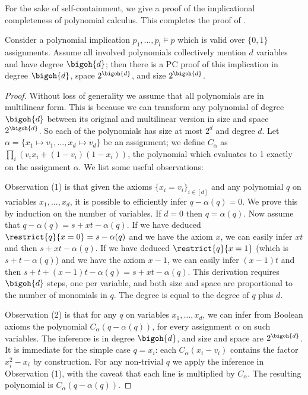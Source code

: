 \documentclass{toc}
\begin{document}
For the sake of self-containment, we give a proof of the
implicational completeness of polynomial calculus. This completes the proof
%
of .    %

\begin{lemma}\label{lmm:pccompleteness}
  Consider a polynomial implication $p_{1}, \ldots, p_{l}\models p$ which is valid over $\{0,1\}$ assignments. Assume all involved polynomials collectively mention $d$ variables and have degree $\bigoh{d}$; then there is a PC proof of this implication in degree $\bigoh{d}$, space $2^{\bigoh{d}}$, and size $2^{\bigoh{d}}$.
\end{lemma}
\begin{proof} Without loss of generality we assume that all
  polynomials are in multilinear form. This is because we can
  transform any polynomial of degree $\bigoh{d}$ between its original
  and multilinear version in size and space $2^{\bigoh{d}}$. So each
  of the polynomials has size at most $2^{d}$ and degree $d$.
  Let $\alpha=\{x_{1}\mapsto v_{1}, \ldots, x_{d}\mapsto v_{d}\}$ be an assignment; we define $C_{\alpha}$ as $\prod_{i} (v_{i}x_{i} + (1-v_{i})(1-x_{i}))$, the polynomial which evaluates to 1 exactly on the assignment $\alpha$. We list some useful observations:

Observation (1) is that given the axioms $\{x_{i}=v_{i}\}_{i\in[d]}$
and any polynomial $q$ on variables $x_{1},\ldots,x_{d}$, it is
possible to efficiently infer $q-\alpha(q)=0$. We prove this by induction on the number of variables. If $d=0$ then $q=\alpha(q)$. Now assume that $q-\alpha(q)=s+xt-\alpha(q)$. If we have deduced $\restrict{q}{x=0}=s-\alpha(q)$ and we have the axiom $x$, we can easily infer $xt$ and then $s+xt-\alpha(q)$. If we have deduced $\restrict{q}{x=1}$ (which is $s+t-\alpha(q)$) and we have the axiom $x-1$, we can easily infer $(x-1)t$ and then $s+t+(x-1)t -\alpha(q) = s + xt -\alpha(q)$.
%
This derivation requires $\bigoh{d}$ steps, one per variable, and both
size and space are proportional to the number of monomials in $q$. The
degree is equal to the degree of $q$ plus $d$.

Observation (2) is that for any $q$ on variables $x_{1},\ldots,x_{d}$,
we can infer from Boolean axioms the polynomial
$C_{\alpha}(q-\alpha(q))$, for every assignment $\alpha$ on such
variables. The inference is in degree $\bigoh{d}$, and size and space are
$2^{\bigoh{d}}$. It is immediate for the simple case $q=x_{i}$: each
$C_{\alpha}(x_{i}-v_{i})$ contains the factor $x^{2}_{i}-x_{i}$ by
construction. For any non-trivial $q$ we apply the inference in
Observation (1), with the caveat that each line is multiplied by
$C_{\alpha}$. The resulting polynomial is $C_{\alpha}(q-\alpha(q))$.


\end{proof}
\end{document}
